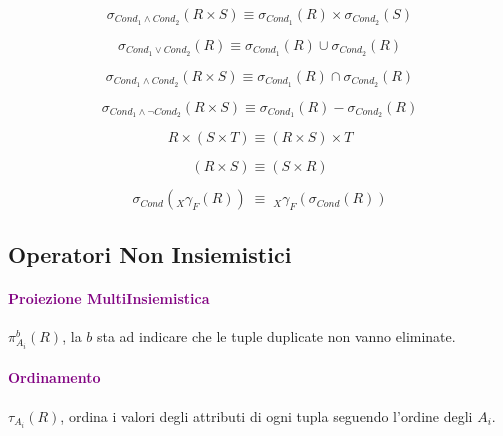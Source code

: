 \begin{equation}
    \sigma_{Cond_{1} \land Cond_{2}}(R \times S) \equiv \sigma_{Cond_{1}}(R) \times \sigma_{Cond_{2}}(S)
\end{equation}

\begin{equation}
    \sigma_{Cond_{1} \lor Cond_{2}}(R) \equiv \sigma_{Cond_{1}}(R) \cup \sigma_{Cond_{2}}(R)
\end{equation}

\begin{equation}
    \sigma_{Cond_{1} \land Cond_{2}}(R \times S) \equiv \sigma_{Cond_{1}}(R) \cap \sigma_{Cond_{2}}(R)
\end{equation}

\begin{equation}
    \sigma_{Cond_{1} \land \neg Cond_{2}}(R \times S) \equiv \sigma_{Cond_{1}}(R) - \sigma_{Cond_{2}}(R)
\end{equation}

\begin{equation}
    R \times (S \times T) \equiv (R \times S) \times T
\end{equation}

\begin{equation}
    (R \times S) \equiv (S \times R)
\end{equation}

\begin{equation}
    \sigma_{Cond}(_X\gamma_F(R))\;\equiv\;_X\gamma_F(\sigma_{Cond}(R))
\end{equation}

\subsection{Operatori Non Insiemistici}

\paragraph{\textcolor{purple}{Proiezione MultiInsiemistica}}
$\pi^{b}_{A_i}(R)$, la $b$ sta ad indicare che le tuple duplicate non vanno eliminate.

\paragraph{\textcolor{purple}{Ordinamento}}
$\tau_{A_i}(R)$, ordina i valori degli attributi di ogni tupla seguendo l'ordine
degli $A_i$.